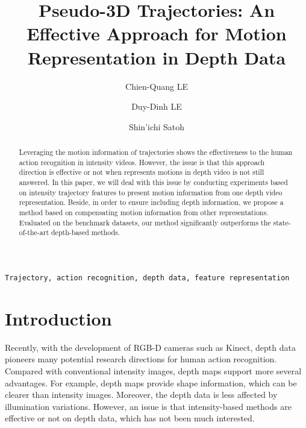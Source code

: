 \documentclass[review]{elsarticle}
\begin{document}
\begin{frontmatter}

\title{Pseudo-3D Trajectories: An Effective Approach for Motion Representation in Depth Data}

\author{Chien-Quang LE}
\address{The Graduate University for Advanced Studies}

\author{Duy-Dinh LE}
\address{National Institute of Informatics, The Graduate University for Advanced Studies}

\author{Shin'ichi Satoh}
\address{National Institute of Informatics, The University of Tokyo}


\begin{abstract}
Leveraging the motion information of trajectories shows the effectiveness to the human action recognition in intensity videos. However, the issue is that this approach direction is effective or not when represents motions in depth video is not still answered. In this paper, we will deal with this issue by conducting experiments based on intensity trajectory features to present motion information from one depth video representation. Beside, in order to ensure including depth information, we propose a method based on compensating motion information from other representations. Evaluated on the benchmark datasets, our method significantly outperforms the state-of-the-art depth-based methods.
\end{abstract}

\begin{keyword}
\texttt{Trajectory, action recognition, depth data, feature representation}
\end{keyword}

\end{frontmatter}

\linenumbers

\section{Introduction}

Recently, with the development of RGB-D cameras such as Kinect, depth data pioneers many potential research directions for human action recognition. Compared with conventional intensity images, depth maps support more several advantages. For example, depth maps provide shape information, which can be clearer than intensity images. Moreover, the depth data is less affected by illumination variations. However, an issue is that intensity-based methods are effective or not on depth data, which has not been much interested.
\end{document}
